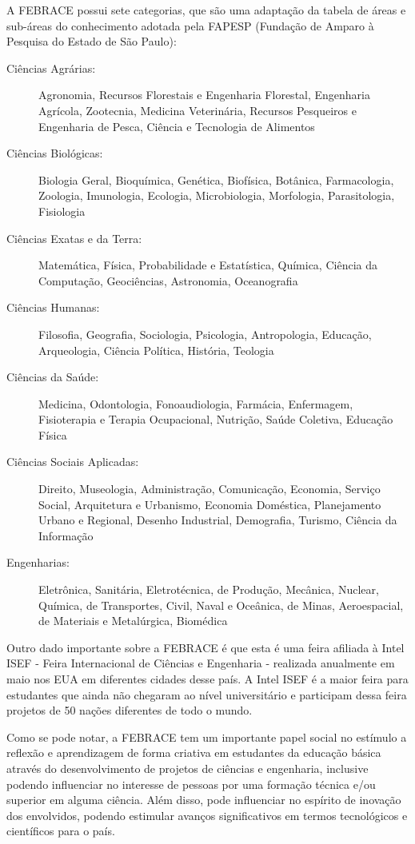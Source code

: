 A FEBRACE possui sete categorias, que são uma adaptação da tabela de áreas e sub-áreas do conhecimento adotada pela FAPESP (Fundação de Amparo à Pesquisa do Estado de São Paulo):

\begin{description}
    \item[Ciências Agrárias:] 
        Agronomia, Recursos Florestais e Engenharia Florestal, Engenharia Agrícola, Zootecnia, Medicina Veterinária, Recursos Pesqueiros e Engenharia de Pesca, Ciência e Tecnologia de Alimentos
    \item[Ciências Biológicas:] 
        Biologia Geral, Bioquímica, Genética, Biofísica, Botânica, Farmacologia, Zoologia, Imunologia, Ecologia, Microbiologia, Morfologia, Parasitologia, Fisiologia 	 
    \item[Ciências Exatas e da Terra:] 
        Matemática, Física, Probabilidade e Estatística, Química, Ciência da Computação, Geociências, Astronomia, Oceanografia 
    \item[Ciências Humanas:] 
        Filosofia, Geografia, Sociologia, Psicologia, Antropologia, Educação, Arqueologia, Ciência Política, História, Teologia 
    \item[Ciências da Saúde:] 
        Medicina, Odontologia, Fonoaudiologia, Farmácia, Enfermagem, Fisioterapia e Terapia Ocupacional, Nutrição, Saúde Coletiva, Educação Física
    \item[Ciências Sociais Aplicadas:] 
        Direito, Museologia, Administração, Comunicação, Economia, Serviço Social, Arquitetura e Urbanismo, Economia Doméstica, Planejamento Urbano e Regional, Desenho Industrial, Demografia, Turismo, Ciência da Informação  	 
    \item[Engenharias:] 
        Eletrônica, Sanitária, Eletrotécnica, de Produção, Mecânica, Nuclear, Química, de Transportes, Civil, Naval e Oceânica, de Minas, Aeroespacial, de Materiais e Metalúrgica, Biomédica 
\end{description}

Outro dado importante sobre a FEBRACE é que esta é uma feira afiliada à Intel ISEF - Feira Internacional de Ciências e Engenharia - realizada anualmente em maio nos EUA em diferentes cidades desse país. A Intel ISEF é a maior feira para estudantes que ainda não chegaram ao nível universitário e participam dessa feira projetos de 50 nações diferentes de todo o mundo.

Como se pode notar, a FEBRACE tem um importante papel social no estímulo a reflexão e aprendizagem de forma criativa em estudantes da educação básica através do desenvolvimento de projetos de ciências e engenharia, inclusive podendo influenciar no interesse de pessoas por uma formação técnica e/ou superior em alguma ciência. Além disso, pode influenciar no espírito de inovação dos envolvidos, podendo estimular avanços significativos em termos tecnológicos e científicos para o país.

